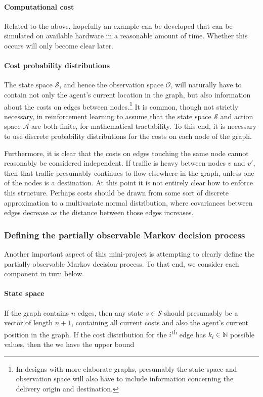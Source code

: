 \paragraph{Computational cost} Related to the above, hopefully an example can be developed that can be simulated on available hardware in a reasonable amount of time. Whether this occurs will only become clear later.

\paragraph{Cost probability distributions} The state space $\mathcal S$, and hence the observation space $\mathcal O$, will naturally have to contain not only the agent's current location in the graph, but also information about the costs on edges between nodes.\footnote{In designs with more elaborate graphs, presumably the state space and observation space will also have to include information concerning the delivery origin and destination.} It is common, though not strictly necessary, in reinforcement learning to assume that the state space $\mathcal S$ and action space $\mathcal A$ are both finite, for mathematical tractability. To this end, it is necessary to use discrete probability distributions for the costs on each node of the graph.

Furthermore, it is clear that the costs on edges touching the same node cannot reasonably be considered independent. If traffic is heavy between nodes $v$ and $v'$, then that traffic presumably continues to flow elsewhere in the graph, unless one of the nodes is a destination. At this point it is not entirely clear how to enforce this structure. Perhaps costs should be drawn from some sort of discrete approximation to a multivariate normal distribution, where covariances between edges decrease as the distance between those edges increases.

\subsubsection{Defining the partially observable Markov decision process}

Another important aspect of this mini-project is attempting to clearly define the partially observable Markov decision process. To that end, we consider each component in turn below.

\paragraph{State space} If the graph contains $n$ edges, then any state $s \in \mathcal S$ should presumably be a vector of length $n + 1$, containing all current costs and also the agent's current position in the graph. If the cost distribution for the $i$\textsuperscript{th} edge has $k_i \in \mathbb N$ possible values, then the we have the upper bound

